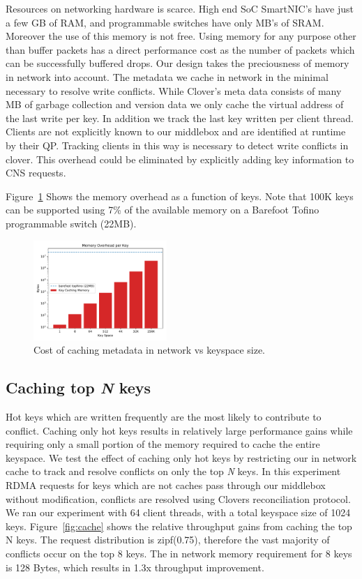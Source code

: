 Resources on networking hardware is scarce. High end SoC SmartNIC's
have just a few GB of RAM, and programmable switches have only MB's of
SRAM. Moreover the use of this memory is not free. Using memory for
any purpose other than buffer packets has a direct performance cost as
the number of packets which can be successfully buffered drops. Our
design takes the preciousness of memory in network into account. The
metadata we cache in network in the minimal necessary to resolve write
conflicts. While Clover's meta data consists of many MB of garbage
collection and version data we only cache the virtual address of the
last write per key. In addition we track the last key written per
client thread. Clients are not explicitly known to our middlebox and
are identified at runtime by their QP. Tracking clients in this way is
necessary to detect write conflicts in clover. This overhead could be
eliminated by explicitly adding key information to CNS requests.

Figure~\ref{fig:memory} Shows the memory overhead as a function of
keys. Note that 100K keys can be supported using 7\% of the available
memory on a Barefoot Tofino programmable switch (22MB).

\begin{figure}
    \includegraphics[width=0.45\textwidth]{fig/memory.pdf}
    \caption{Cost of caching metadata in network vs keyspace size.}
    \label{fig:memory}
\end{figure}

\subsection{Caching top \textit{N} keys} 
Hot keys which are written frequently are the most likely to
contribute to conflict. Caching only hot keys results in relatively
large performance gains while requiring only a small portion of the
memory required to cache the entire keyspace. We test the effect of
caching only hot keys by restricting our in network cache to track and
resolve conflicts on only the top \textit{N} keys. In this experiment
RDMA requests for keys which are not caches pass through our middlebox
without modification, conflicts are resolved using Clovers
reconciliation protocol. We ran our experiment with 64 client threads,
with a total keyspace size of 1024 keys. Figure~\ref{fig:cache} shows
the relative throughput gains from caching the top N keys. The request
distribution is zipf(0.75), therefore the vast majority of conflicts
occur on the top 8 keys. The in network memory requirement for 8 keys
is 128 Bytes, which results in 1.3x throughput improvement.

